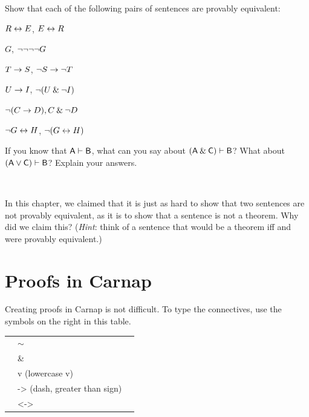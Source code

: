 \problempart
Show that each of the following pairs of sentences are provably equivalent:
\begin{earg}
\item $R \leftrightarrow E$, $E \leftrightarrow R$
\item $G$, ${\neg}{\neg}{\neg}{\neg} G$
\item $T\rightarrow S$, ${\neg} S \rightarrow {\neg} T$
\item $U \rightarrow I$, ${\neg}(U \mathbin{\&} {\neg} I)$
\item ${\neg} (C \rightarrow D), C \mathbin{\&} {\neg} D$
\item ${\neg} G \leftrightarrow H$, ${\neg}(G \leftrightarrow H)$ 
\end{earg}

\problempart
If you know that $\mathsf{A}\vdash\mathsf{B}$, what can you say about $(\mathsf{A}\mathbin{\&}\mathsf{C})\vdash\mathsf{B}$? What about $(\mathsf{A}\vee\mathsf{C})\vdash\mathsf{B}$? Explain your answers.

\

\problempart In this chapter, we claimed that it is just as hard to show that two sentences are not provably equivalent, as it is to show that a sentence is not a theorem. Why did we claim this? (\emph{Hint}: think of a sentence that would be a theorem iff  and  were provably equivalent.)




\chapter{Proofs in Carnap}\label{s:Carnap-proofs}

Creating proofs in Carnap is not difficult. To type the connectives, use the symbols on the right in this table. 

	\begin{table}[h]
	\center
	\begin{tabular}{p{1cm} l l}
	
	\hline
	\enot&$\sim$&\\
	\eand&\&&\\
	\eor&v (lowercase v)&\\
	\eif&-> (dash, greater than sign)&\\
	\eiff&<->&\\
	\hline
	\end{tabular}
	\end{table}


